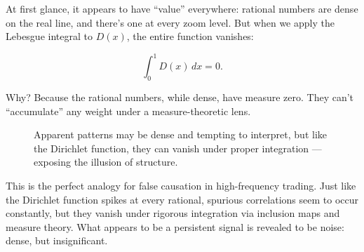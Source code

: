 At first glance, it appears to have “value” everywhere: rational numbers are dense on the real line, and there’s one at every zoom level. But when we apply the Lebesgue integral to \( D(x) \), the entire function vanishes:

\[
\int_{0}^{1} D(x) \,dx = 0.
\]

Why? Because the rational numbers, while dense, have measure zero. They can’t “accumulate” any weight under a measure-theoretic lens.

\begin{figure}[H]
\centering
{}
\caption{Apparent patterns may be dense and tempting to interpret, but like the Dirichlet function, they can vanish under proper integration — exposing the illusion of structure.}
\end{figure}

This is the perfect analogy for false causation in high-frequency trading. Just like the Dirichlet function spikes at every rational, spurious correlations seem to occur constantly, but they vanish under rigorous integration via inclusion maps and measure theory. What appears to be a persistent signal is revealed to be noise: dense, but insignificant.

